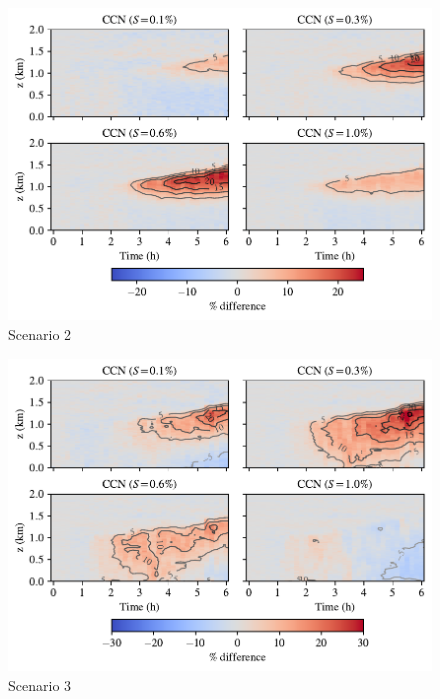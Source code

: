 \newpage
\begin{figure}[h]
  \centering
    \includegraphics[width=\textwidth]{figures/chapter5/height-time-ccn-pdiff-road-10x.pdf}
    \caption{Scenario 2}
    \label{fig:ht-ccn-pdiff-s2}
\end{figure}

\newpage
\begin{figure}[h]
  \centering
    \includegraphics[width=\textwidth]{figures/chapter5/height-time-ccn-pdiff-point-source-1x1.pdf}
    \caption{Scenario 3}
    \label{fig:ht-ccn-pdiff-s3}
\end{figure}


